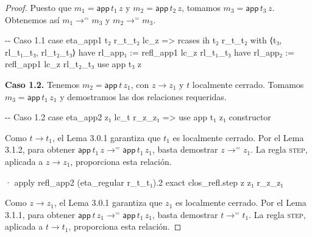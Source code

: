 \documentclass[
  spanish,
  letterpaper,
  DIV=11,
  numbers=noendperiod]{scrreprt}
\newenvironment{Shaded}{\begin{snugshade}}{\end{snugshade}}
\newcommand{\CommentTok}[1]{\textcolor[rgb]{0.37,0.37,0.37}{#1}}
\newcommand{\KeywordTok}[1]{\textcolor[rgb]{0.00,0.23,0.31}{\textbf{#1}}}
\newcommand{\NormalTok}[1]{\textcolor[rgb]{0.00,0.23,0.31}{#1}}
\renewcommand{\NormalTok}[1]{\textcolor[HTML]{000000}{#1}}
\renewcommand{\KeywordTok}[1]{\textcolor[HTML]{0000FF}{#1}}
\renewcommand{\CommentTok}[1]{\textcolor[HTML]{008000}{#1}}
\let\oldgreater\textgreater
\renewcommand{\textgreater}{\null\oldgreater}%
\theoremstyle{remark}
\begin{document}
\begin{proof}
Puesto que \(m_1=\mathsf{app}\,t_1\,z\) y \(m_2=\mathsf{app}\,t_2\,z\),
tomamos \(m_3=\mathsf{app}\,t_3\,z\). Obtenemos así
\(m_1\longrightarrow^{=}m_3\) y \(m_2\longrightarrow^{=}m_3\).

\begin{Shaded}
\begin{Highlighting}[]
    \CommentTok{{-}{-} Caso 1.1}
\NormalTok{    case eta\_app1 t₂ r\_t\_t₂ lc\_z =\textgreater{}}
\NormalTok{      rcases ih t₂ r\_t\_t₂ }\KeywordTok{with}\NormalTok{ ⟨t₃, rl\_t₁\_t₃, rl\_t₂\_t₃⟩}
      \KeywordTok{have}\NormalTok{ rl\_app₁ := refl\_app1 lc\_z rl\_t₁\_t₃}
      \KeywordTok{have}\NormalTok{ rl\_app₂ := refl\_app1 lc\_z rl\_t₂\_t₃}
\NormalTok{      use app t₃ z}
\end{Highlighting}
\end{Shaded}

\textbf{Caso 1.2.} Tenemos \(m_2=\mathsf{app} \, t \, z_1\), con
\(z\longrightarrow z_1\) y \(t\) localmente cerrado. Tomamos
\(m_3=\mathsf{app} \, t_1 \, z_1\) y demostramos las dos relaciones
requeridas.

\begin{Shaded}
\begin{Highlighting}[]
    \CommentTok{{-}{-} Caso 1.2}
\NormalTok{    case eta\_app2 z₁ lc\_t r\_z\_z₁ =\textgreater{}}
\NormalTok{      use app t₁ z₁}
\NormalTok{      constructor}
\end{Highlighting}
\end{Shaded}

Como \(t\longrightarrow t_1\), el Lema 3.0.1 garantiza que \(t_1\) es
localmente cerrado. Por el Lema 3.1.2, para obtener
\(\mathsf{app} \, t_1 \, z\longrightarrow^{=} \mathsf{app} \, t_1 \, z_1\),
basta demostrar \(z\longrightarrow^{=}z_1\). La regla \textsc{step},
aplicada a \(z\longrightarrow z_1\), proporciona esta relación.

\begin{Shaded}
\begin{Highlighting}[]
\NormalTok{      · }\KeywordTok{apply}\NormalTok{ refl\_app2 (eta\_regular r\_t\_t₁).2}
        \KeywordTok{exact}\NormalTok{ clos\_refl.step z z₁ r\_z\_z₁}
\end{Highlighting}
\end{Shaded}

Como \(z\longrightarrow z_1\), el Lema 3.0.1 garantiza que \(z_1\) es
localmente cerrado. Por el Lema 3.1.1, para obtener
\(\mathsf{app} \, t \, z_1\longrightarrow^{=} \mathsf{app} \, t_1 \, z_1\),
basta demostrar \(t\longrightarrow^{=}t_1\). La regla \textsc{step},
aplicada a \(t\longrightarrow t_1\), proporciona esta relación.


\end{proof}
\end{document}
